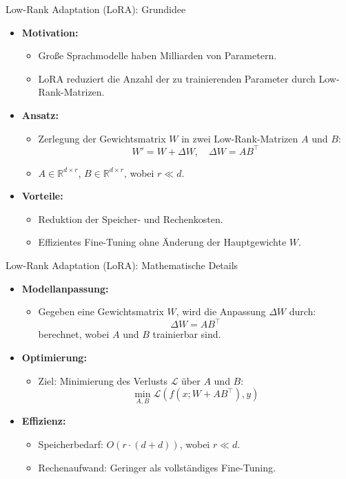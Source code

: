 \documentclass[aspectratio=1610, xcolor=dvipsnames, 9pt]{beamer}
\begin{document}
\begin{frame}{Low-Rank Adaptation (LoRA): Grundidee}
  \begin{itemize}
    \item \textbf{Motivation:}
      \begin{itemize}
        \item Große Sprachmodelle haben Milliarden von Parametern.
        \item LoRA reduziert die Anzahl der zu trainierenden Parameter durch Low-Rank-Matrizen.
      \end{itemize}
    \item \textbf{Ansatz:}
      \begin{itemize}
        \item Zerlegung der Gewichtsmatrix \( W \) in zwei Low-Rank-Matrizen \( A \) und \( B \):
          \[
          W' = W + \Delta W, \quad \Delta W = A B^\top
          \]
        \item \( A \in \mathbb{R}^{d \times r} \), \( B \in \mathbb{R}^{d \times r} \), wobei \( r \ll d \).
      \end{itemize}
    \item \textbf{Vorteile:}
      \begin{itemize}
        \item Reduktion der Speicher- und Rechenkosten.
        \item Effizientes Fine-Tuning ohne Änderung der Hauptgewichte \( W \).
      \end{itemize}
  \end{itemize}
\end{frame}

\begin{frame}{Low-Rank Adaptation (LoRA): Mathematische Details}
  \begin{itemize}
    \item \textbf{Modellanpassung:}
      \begin{itemize}
        \item Gegeben eine Gewichtsmatrix \( W \), wird die Anpassung \( \Delta W \) durch:
          \[
          \Delta W = A B^\top
          \]
          berechnet, wobei \( A \) und \( B \) trainierbar sind.
      \end{itemize}
    \item \textbf{Optimierung:}
      \begin{itemize}
        \item Ziel: Minimierung des Verlusts \( \mathcal{L} \) über \( A \) und \( B \):
          \[
          \min_{A, B} \mathcal{L}(f(x; W + A B^\top), y)
          \]
      \end{itemize}
    \item \textbf{Effizienz:}
      \begin{itemize}
        \item Speicherbedarf: \( O(r \cdot (d + d)) \), wobei \( r \ll d \).
        \item Rechenaufwand: Geringer als vollständiges Fine-Tuning.
      \end{itemize}
  \end{itemize}
\end{frame}
\end{document}
